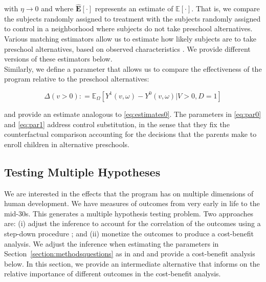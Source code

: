 \noindent with $\eta \rightarrow 0$ and where $\widehat{\mathbf{E}}[\cdot]$ represents an estimate of $\mathbb{E}[\cdot]$. That is, we compare the subjects randomly assigned to treatment with the subjects randomly assigned to control in a neighborhood where subjects do not take preschool alternatives. Various matching estimators allow us to estimate how likely subjects are to take preschool alternatives, based on observed characteristics \citep{Heckman_Ichimura_etal_1997_REStud,Heckman_Ichimura_etal_1998_REStud}. We provide different versions of these estimators below.\\

\noindent Similarly, we define a parameter that allows us to compare the effectiveness of the program relative to the preschool alternatives: 

\begin{equation}
\Delta \left( v > 0 \right) : =   \mathbb{E}_{\Omega} \left[ Y^1 \left( v, \omega \right) - Y^0 \left( v, \omega \right) | V > 0, D = 1 \right] \label{eq:par1}
\end{equation}

\noindent and provide an estimate analogous to \eqref{eq:estimates0}. The parameters in \eqref{eq:par0} and \eqref{eq:par1} address control substitution, in the sense that they fix the counterfactual comparison accounting for the decisions that the parents make to enroll children in alternative preschools.

\subsection{Testing Multiple Hypotheses}  \label{section:counts}

\noindent We are interested in the effects that the program has on multiple dimensions of human development. We have measures of outcomes from very early in life to the mid-30s. This generates a multiple hypothesis testing problem. Two approaches are: (i) adjust the inference to account for the correlation of the outcomes using a step-down procedure \citep{Lehman_Romano_2005_AnnStat,Romano_Shaikh_2006_AnnStat}; and (ii) monetize the outcomes to produce a cost-benefit analysis. We adjust the inference when estimating the parameters in Section~\ref{section:methodsquestions} as in \citet{Lehman_Romano_2005_AnnStat} and \citet{Romano_Shaikh_2006_AnnStat} and provide a cost-benefit analysis below. In this section, we provide an intermediate alternative that informs on the relative importance of different outcomes in the cost-benefit analysis.\\

